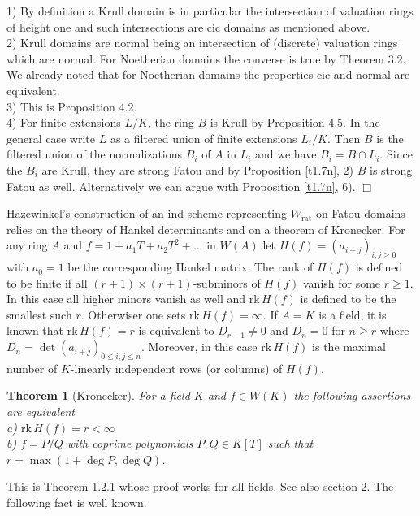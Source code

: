 \documentclass[12pt,leqno]{article}
\newcommand{\rk}{\mathrm{rk}\,}
\newcommand{\ind}{\mathrm{ind}}
\newcommand{\rat}{\mathrm{rat}}
\newtheorem{theorem}{Theorem}[section]
\newenvironment{proof}{\noindent {\bf Proof}}{\mbox{}\hspace*{\fill}$\Box$}
\begin{document}
\begin{proof}
1) By definition a Krull domain is in particular the intersection of valuation rings of height one and such intersections are cic domains as mentioned above. \\
2) Krull domains are normal being an intersection of (discrete) valuation rings which are normal. For Noetherian domains the converse is true by \cite{S} Theorem 3.2. We already noted that for Noetherian domains the properties cic and normal are equivalent. \\
3) This is \cite{S} Proposition 4.2.\\
4) For finite extensions $L / K$, the ring $B$ is Krull by \cite{S} Proposition 4.5. In the general case write $L$ as a filtered union of finite extensions $L_i / K$. Then $B$ is the filtered union of the normalizations $B_i$ of $A$ in $L_i$ and we have $B_i = B \cap L_i$. Since the $B_i$ are Krull, they are strong Fatou and by Proposition \ref{t1.7n}, 2) $B$ is strong Fatou as well. Alternatively we can argue with Proposition \ref{t1.7n}, 6).
\end{proof}

Hazewinkel's construction of an $\ind$-scheme representing $W_{\rat}$ on Fatou domains relies on the theory of Hankel determinants and on a theorem of Kronecker. For any ring $A$ and $f = 1 + a_1 T + a_2 T^2 + \ldots$ in $W (A)$ let $H (f) = (a_{i+j})_{i,j \ge 0}$ with $a_0 = 1$ be the corresponding Hankel matrix. The rank of $H (f)$ is defined to be finite if all $(r+1) \times (r+1)$-subminors of $H (f)$ vanish for some $r \ge 1$. In this case all higher minors vanish as well and $\rk H (f)$ is defined to be the smallest such $r$. Otherwiser one sets $\rk H (f) = \infty$. If $A = K$ is a field, it is known that $\rk H (f) = r$ is equivalent to $D_{r-1} \neq 0$ and $D_n = 0$ for $n \ge r$ where $D_n = \det (a_{i+j})_{0 \le i , j \le n}$. Moreover, in this case $\rk H (f)$ is the maximal number of $K$-linearly independent rows (or columns) of $H (f)$. 

\begin{theorem}[Kronecker]
\label{t1.7}
For a field $K$ and $f \in W (K)$ the following assertions are equivalent\\
a) $\rk H (f) = r < \infty$\\
b) $f = P / Q$ with coprime polynomials $P , Q \in K [T]$ such that $r = \max (1 + \deg P , \deg Q)$. 
\end{theorem}

This is \cite{Ko} Theorem 1.2.1 whose proof works for all fields. See also \cite{BB} section 2. The following fact is well known.
\end{document}
